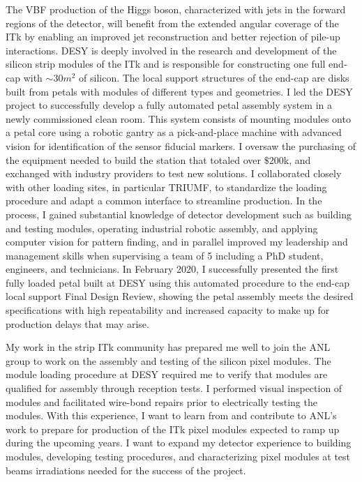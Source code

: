 \documentclass[a4paper]{article}
\begin{document}
The VBF production of the Higgs boson, characterized with jets in the forward regions of the detector, will benefit from the extended angular coverage of the ITk by enabling an improved jet reconstruction and better rejection of pile-up interactions.
DESY is deeply involved in the research and development of the silicon strip modules of the ITk and is responsible for constructing one full end-cap
with $\sim 30 m^2$ of silicon. The local support structures of the end-cap are disks built from petals with modules of different types and geometries.
I led the DESY project to successfully develop a fully automated petal assembly system in a newly commissioned clean room.
This system consists of mounting modules onto a petal core using a robotic gantry as a pick-and-place machine with advanced vision for identification of the sensor fiducial markers. I oversaw the purchasing of the equipment needed to build the station that totaled over $\$200$k, and exchanged with industry providers to test new solutions. I collaborated closely with other loading sites, in particular TRIUMF, to standardize the loading procedure and adapt a common interface to streamline production.
In the process, I gained substantial knowledge of detector development such as building and testing modules, operating industrial robotic assembly, and applying computer vision for pattern finding, and in parallel improved my leadership and management skills when supervising a team of 5 including a PhD student, engineers, and technicians. In February 2020, I successfully presented the first fully loaded petal built at DESY using this automated procedure to the end-cap local support Final Design Review, showing the petal assembly meets the desired specifications with high repeatability and increased capacity to make up for production delays that may arise.

My work in the strip ITk community has prepared me well to join the ANL group to work on the assembly and testing of the silicon pixel modules.
The module loading procedure at DESY required me to verify that modules are qualified for assembly through reception tests. I performed visual inspection of modules and facilitated wire-bond repairs prior to electrically testing the modules.
With this experience, I want to learn from and contribute to ANL's work to prepare for production of the ITk pixel modules expected to ramp up during the upcoming years. I want to expand my detector experience to building modules, developing testing procedures, and characterizing pixel modules at test beams irradiations needed for the success of the project.
\end{document}
